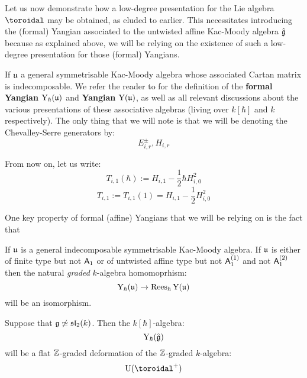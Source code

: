         Let us now demonstrate how a low-degree presentation for the Lie algebra $\toroidal$ may be obtained, as eluded to earlier. This necessitates introducing the (formal) Yangian associated to the untwisted affine Kac-Moody algebra $\hat{\mathfrak{g}}$ because as explained above, we will be relying on the existence of such a low-degree presentation for those (formal) Yangians.
        \begin{convention}
            If $\mathfrak{u}$ a general symmetrisable Kac-Moody algebra whose associated Cartan matrix is indecomposable. We refer the reader to \cite[Section 2]{guay_nakajima_wendlandt_affine_yangian_coproduct} for the definition of the \textbf{formal Yangian} $\mathrm{Y}_{\hbar}(\mathfrak{u})$ and \textbf{Yangian} $\mathrm{Y}(\mathfrak{u})$, as well as all relevant discussions about the various  presentations of these associative algebras (living over $k[\hbar]$ and $k$ respectively). The only thing that we will note is that we will be denoting the Chevalley-Serre generators by:
                $$E_{i, r}^{\pm}, H_{i, r}$$
        \end{convention}
        \begin{convention}
            From now on, let us write:
                $$T_{i, 1}(\hbar) := H_{i, 1} - \frac12 \hbar H_{i, 0}^2$$
                $$T_{i, 1} := T_{i, 1}(1) = H_{i, 1} - \frac12 H_{i, 0}^2$$
        \end{convention}

        One key property of formal (affine) Yangians that we will be relying on is the fact that 
        \begin{lemma} \label{lemma: formal_yangians_as_rees_algebras}
            \cite[Theorem 6.10]{guay_nakajima_wendlandt_affine_yangian_vertex_representations_and_PBW} If $\mathfrak{u}$ is a general indecomposable symmetrisable Kac-Moody algebra. If $\mathfrak{u}$ is either of finite type but not $\mathsf{A}_1$ or of untwisted affine type but not $\mathsf{A}_1^{(1)}$ and not $\mathsf{A}_1^{(2)}$ then the natural \textit{graded} $k$-algebra homomoprhism:
                $$\mathrm{Y}_{\hbar}(\mathfrak{u}) \to \operatorname{Rees}_{\hbar} \mathrm{Y}(\mathfrak{u})$$
            will be an isomorphism. 
        \end{lemma}
         \begin{corollary} \label{coro: formal_affine_yangians_as_flat_graded_deformations}
            Suppose that $\mathfrak{g} \not \simeq \mathfrak{sl}_2(k)$. Then the $k[\hbar]$-algebra:
                $$\mathrm{Y}_{\hbar}(\hat{\mathfrak{g}})$$
            will be a flat $\mathbb{Z}$-graded deformation of the $\mathbb{Z}$-graded $k$-algebra:
                $$\rmU(\toroidal^+)$$
         \end{corollary}
         
